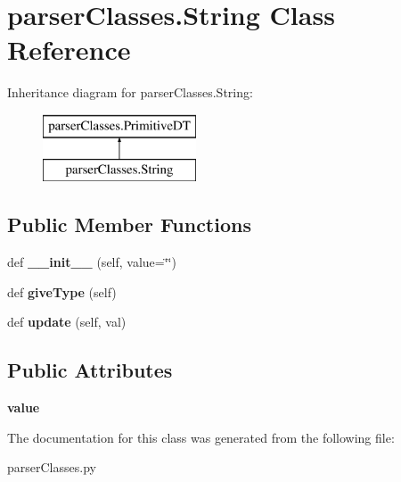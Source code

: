 \hypertarget{classparser_classes_1_1_string}{}\section{parser\+Classes.\+String Class Reference}
\label{classparser_classes_1_1_string}
Inheritance diagram for parser\+Classes.\+String\+:\begin{figure}[H]
\begin{center}
\leavevmode
\includegraphics[height=2.000000cm]{classparser_classes_1_1_string}
\end{center}
\end{figure}
\subsection*{Public Member Functions}
\begin{DoxyCompactItemize}
\item 
\mbox{\label{classparser_classes_1_1_string_a4c4e2819010c0c58d4f628f3584fdd69}} 
def {\bfseries \+\_\+\+\_\+init\+\_\+\+\_\+} (self, value=\textquotesingle{}\char`\"{}\char`\"{}\textquotesingle{})
\item 
\mbox{\label{classparser_classes_1_1_string_a7a00e512a68ea3f88b25bcb060382393}} 
def {\bfseries give\+Type} (self)
\item 
\mbox{\label{classparser_classes_1_1_string_a11c7326188baeb6a6e43a06d6f94d055}} 
def {\bfseries update} (self, val)
\end{DoxyCompactItemize}
\subsection*{Public Attributes}
\begin{DoxyCompactItemize}
\item 
\mbox{\label{classparser_classes_1_1_string_a04fcb7b360e30d106a7879b0964274b3}} 
{\bfseries value}
\end{DoxyCompactItemize}


The documentation for this class was generated from the following file\+:\begin{DoxyCompactItemize}
\item 
parser\+Classes.\+py\end{DoxyCompactItemize}
